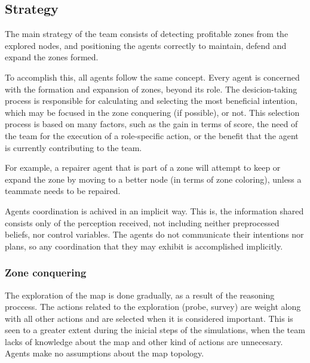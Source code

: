 \documentclass{llncs2e/llncs}
\begin{document}
\subsection{Strategy}

    The main strategy of the team consists of detecting profitable zones from the 
    explored nodes, and positioning the agents correctly to maintain, defend 
    and expand the zones formed. 
    
    To accomplish this, all agents follow the same concept. Every agent is concerned 
    with the formation and expansion of zones, beyond its role.
    The desicion-taking process is responsible for calculating and selecting the
    most beneficial intention, which may be focused in the zone conquering (if possible),
    or not.
    This selection process is based on many factors, such as the gain in terms 
    of score, the need of the team for the execution of a role-specific action, or
    the benefit that the agent is currently contributing to the team. 
    
    For example, a repairer agent that is part of a zone will attempt to keep or
    expand the zone by moving to a better node (in terms of zone coloring), 
    unless a teammate needs to be repaired.
    
    Agents coordination is achived in an implicit way. This is, the information
    shared consists only of the perception received, not including neither 
    preprocessed beliefs, nor control variables. The agents do not communicate
    their intentions nor plans, so any coordination that they may exhibit is 
    accomplished implicitly.
       
\subsubsection{Zone conquering}
    
    The exploration of the map is done gradually, as a result of the reasoning 
    proccess. The actions related to the exploration (probe, survey) are weight 
    along with all other actions and are selected when it is considered important. 
    This is seen to a greater extent during the inicial steps of the simulations, 
    when the team lacks of knowledge about the map and other kind of actions are 
    unnecesary. Agents make no assumptions about the map topology.
\end{document}
